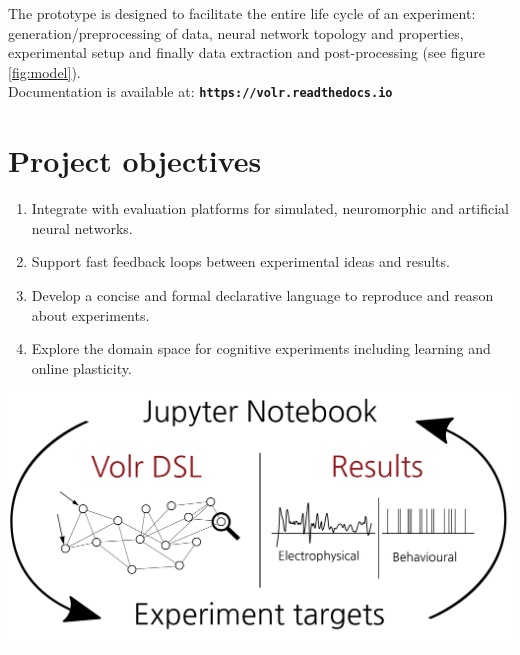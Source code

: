 \documentclass[a0,portrait]{a0poster}
\begin{document}
\begin{multicols}{2}
The prototype is designed to facilitate the entire life cycle of an experiment: 
generation/preprocessing of data, neural network topology and properties, experimental setup 
and finally data extraction and post-processing (see figure \ref{fig:model}).\\[0.4cm]
\indent Documentation is available at: \hspace{0.5cm} \textbf{\texttt{https://volr.readthedocs.io}}

% 

\color{DarkSlateGray} %

\section*{Project objectives}

\begin{enumerate}[itemsep=1mm]
\item Integrate with evaluation platforms for simulated, neuromorphic and artificial neural networks.
\item Support fast feedback loops between experimental ideas and results.
\item Develop a concise and formal declarative language to reproduce and reason about experiments.
\item Explore the domain space for cognitive experiments including learning and online plasticity.
\end{enumerate}

\begin{center}\vspace{0.3cm}
\includegraphics[width=0.9\linewidth]{volr_model}
\label{fig:model}
\end{center}


\end{multicols}
\end{document}
